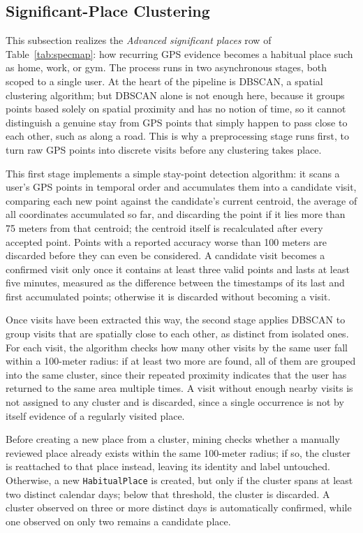 \documentclass[conference,a4paper]{IEEEtran}
\begin{document}
\subsection{Significant-Place Clustering}

This subsection realizes the \textit{Advanced significant places} row of Table~\ref{tab:specmap}: how recurring GPS evidence becomes a habitual place such as home, work, or gym. The process runs in two asynchronous stages, both scoped to a single user. At the heart of the pipeline is DBSCAN, a spatial clustering algorithm; but DBSCAN alone is not enough here, because it groups points based solely on spatial proximity and has no notion of time, so it cannot distinguish a genuine stay from GPS points that simply happen to pass close to each other, such as along a road. This is why a preprocessing stage runs first, to turn raw GPS points into discrete visits before any clustering takes place.

This first stage implements a simple stay-point detection algorithm: it scans a user's GPS points in temporal order and accumulates them into a candidate visit, comparing each new point against the candidate's current centroid, the average of all coordinates accumulated so far, and discarding the point if it lies more than 75 meters from that centroid; the centroid itself is recalculated after every accepted point. Points with a reported accuracy worse than 100 meters are discarded before they can even be considered. A candidate visit becomes a confirmed visit only once it contains at least three valid points and lasts at least five minutes, measured as the difference between the timestamps of its last and first accumulated points; otherwise it is discarded without becoming a visit.

Once visits have been extracted this way, the second stage applies DBSCAN to group visits that are spatially close to each other, as distinct from isolated ones. For each visit, the algorithm checks how many other visits by the same user fall within a 100-meter radius: if at least two more are found, all of them are grouped into the same cluster, since their repeated proximity indicates that the user has returned to the same area multiple times. A visit without enough nearby visits is not assigned to any cluster and is discarded, since a single occurrence is not by itself evidence of a regularly visited place.

Before creating a new place from a cluster, mining checks whether a manually reviewed place already exists within the same 100-meter radius; if so, the cluster is reattached to that place instead, leaving its identity and label untouched. Otherwise, a new \texttt{HabitualPlace} is created, but only if the cluster spans at least two distinct calendar days; below that threshold, the cluster is discarded. A cluster observed on three or more distinct days is automatically confirmed, while one observed on only two remains a candidate place.
\end{document}
